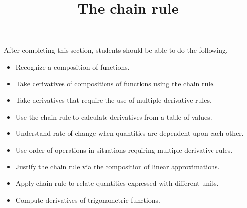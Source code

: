 \documentclass{ximera}
\title{The chain rule}
\begin{document}
\begin{abstract}
\end{abstract}

\maketitle

\begin{sectionOutcomes}

After completing this section, students should be able to do the following.

\begin{itemize}
	\item Recognize a composition of functions.
	\item Take derivatives of compositions of functions using the chain rule.
	\item Take derivatives that require the use of multiple derivative rules.
	\item Use the chain rule to calculate derivatives from a table of values.
	\item Understand rate of change when quantities are dependent upon each other.
	\item Use order of operations in situations requiring multiple derivative rules.
        \item Justify the chain rule via the composition of linear approximations.
        \item Apply chain rule to relate quantities expressed with different units.
        \item Compute derivatives of trigonometric functions.
\end{itemize}

\end{sectionOutcomes}
\end{document}
